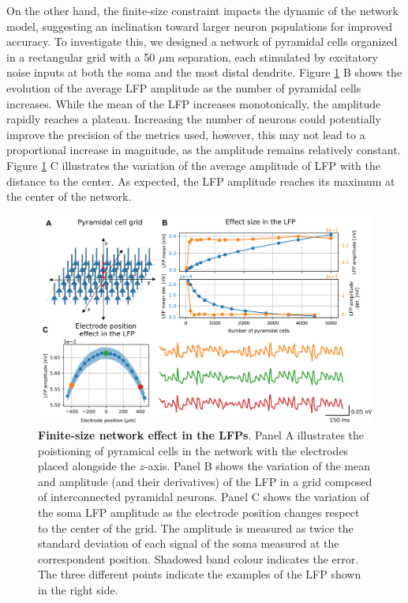 \documentclass[../main.tex]{subfiles}
\begin{document}
On the other hand, the finite-size constraint impacts the dynamic of the network model, suggesting an inclination toward larger neuron populations for improved accuracy.
To investigate this, we designed a network of pyramidal cells organized in a rectangular grid with a 50 $\mu$m separation, each stimulated by excitatory noise inputs at both the soma and the most distal dendrite.
Figure \ref{fig:finite_size_effect} B shows the evolution of the average LFP amplitude as the number of pyramidal cells increases.
While the mean of the LFP increases monotonically, the amplitude rapidly reaches a plateau.
Increasing the number of neurons could potentially improve the precision of the metrics used, however, this may not lead to a proportional increase in magnitude, as the amplitude remains relatively constant.
Figure \ref{fig:finite_size_effect} C illustrates the variation of the average amplitude of LFP with the distance to the center.
As expected, the LFP amplitude reaches its maximum at the center of the network.
\begin{figure}[!htb]
    \centering
    \includegraphics[width=\textwidth]{chapter4/figures/LFPproperties.png}
    \caption{\textbf{Finite-size network effect in the LFPs}.
    Panel A illustrates the poistioning of pyramical cells in the network with the electrodes placed alongside the $z$-axis. 
    Panel B shows the variation of the mean and amplitude (and their derivatives) of the LFP in a grid composed of interconnected pyramidal neurons.
    Panel C shows the variation of the soma LFP amplitude as the electrode position changes respect to the center of the grid.
    The amplitude is measured as twice the standard deviation of each signal of the soma measured at the correspondent position.
    Shadowed band colour
    indicates the error.
    The three different points indicate the examples of the LFP shown in the right side.}
    \label{fig:finite_size_effect}
\end{figure}
\end{document}
